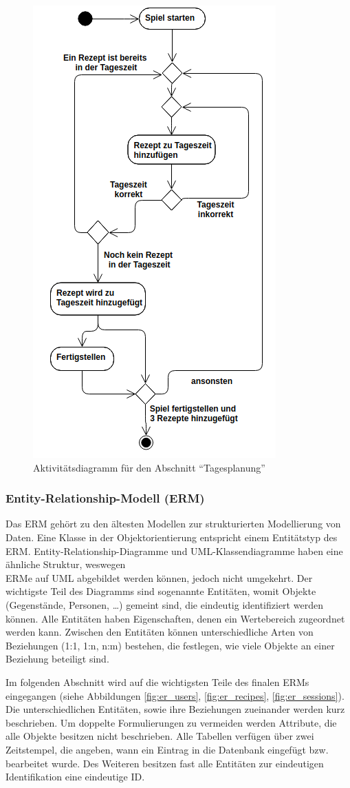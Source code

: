 \begin{figure}[H]
    \centering
	\includegraphics[width=0.4\linewidth]{figures/development/planning/activity/day-planning.png}
	\caption{Aktivitätsdiagramm für den Abschnitt \enquote{Tagesplanung}}
	\label{fig:act-day-planning}
\end{figure}

\subsubsection{Entity-Relationship-Modell (ERM)}
Das \acs{ERM} gehört zu den ältesten Modellen zur strukturierten Modellierung von Daten. Eine Klasse in der Objektorientierung entspricht einem Entitätstyp des \acs{ERM}. Entity-Relationship-Diagramme und \acs{UML}-Klassendiagramme haben eine ähnliche Struktur, weswegen \\ \acl{ERM}e auf \acs{UML} abgebildet werden können, jedoch nicht umgekehrt. Der wichtigste Teil des Diagramms sind sogenannte Entitäten, womit Objekte (Gegenstände, Personen, \dots) gemeint sind, die eindeutig identifiziert werden können. Alle Entitäten haben Eigenschaften, denen ein Wertebereich zugeordnet werden kann. Zwischen den Entitäten können unterschiedliche Arten von Beziehungen (1:1, 1:n, n:m) bestehen, die festlegen, wie viele Objekte an einer Beziehung beteiligt sind. \cite{goll:2011:methods_architectures}

Im folgenden Abschnitt wird auf die wichtigsten Teile des finalen \acl{ERM}s eingegangen (siehe Abbildungen \ref{fig:er_users}, \ref{fig:er_recipes}, \ref{fig:er_sessions}). Die unterschiedlichen Entitäten, sowie ihre Beziehungen zueinander werden kurz beschrieben. Um doppelte Formulierungen zu vermeiden werden Attribute, die alle Objekte besitzen nicht beschrieben. Alle Tabellen verfügen über zwei Zeitstempel, die angeben, wann ein Eintrag in die Datenbank eingefügt \acs{bzw.} bearbeitet wurde. Des Weiteren besitzen fast alle Entitäten zur eindeutigen Identifikation eine eindeutige ID.

